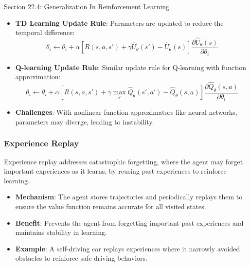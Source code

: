 \begin{notes}{Section 22.4: Generalization In Reinforcement Learning}
\begin{highlight}
        \begin{itemize}
            \item \textbf{TD Learning Update Rule}: Parameters are updated to reduce the temporal difference:
            \[
            \theta_i \leftarrow \theta_i + \alpha [R(s, a, s') + \gamma \hat{U}_\theta(s') - \hat{U}_\theta(s)] \frac{\partial \hat{U}_\theta(s)}{\partial \theta_i}
            \]
            \item \textbf{Q-learning Update Rule}: Similar update rule for Q-learning with function approximation:
            \[
            \theta_i \leftarrow \theta_i + \alpha [R(s, a, s') + \gamma \max_{a'} \hat{Q}_\theta(s', a') - \hat{Q}_\theta(s, a)] \frac{\partial \hat{Q}_\theta(s, a)}{\partial \theta_i}
            \]
            \item \textbf{Challenges}: With nonlinear function approximators like neural networks, parameters may diverge, leading to instability.
        \end{itemize}
    
    \end{highlight}
    
    \subsubsection*{Experience Replay}
    
    Experience replay addresses catastrophic forgetting, where the agent may forget important experiences as it learns, by reusing past experiences to reinforce learning.
    
    \begin{highlight}
    
        \begin{itemize}
            \item \textbf{Mechanism}: The agent stores trajectories and periodically replays them to ensure the value function remains accurate for all visited states.
            \item \textbf{Benefit}: Prevents the agent from forgetting important past experiences and maintains stability in learning.
            \item \textbf{Example}: A self-driving car replays experiences where it narrowly avoided obstacles to reinforce safe driving behaviors.
        \end{itemize}
    
    \end{highlight}
    

\end{notes}
